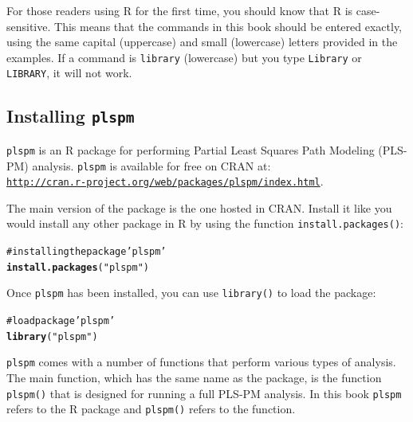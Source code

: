 \documentclass[12pt]{book}\usepackage{graphicx, color}
\makeatletter
\newcommand{\hlfunctioncall}[1]{\textcolor[rgb]{0.501960784313725,0,0.329411764705882}{\textbf{#1}}}%
\newcommand{\hlstring}[1]{\textcolor[rgb]{0.6,0.6,1}{#1}}%
\newcommand{\hlcomment}[1]{\textcolor[rgb]{0.180392156862745,0.6,0.341176470588235}{#1}}%
\newenvironment{kframe}{%
 \def\at@end@of@kframe{}%
 \ifinner\ifhmode%
  \def\at@end@of@kframe{\end{minipage}}%
  \begin{minipage}{\columnwidth}%
 \fi\fi%
 \def\FrameCommand##1{\hskip\@totalleftmargin \hskip-\fboxsep
 \colorbox{shadecolor}{##1}\hskip-\fboxsep
     \hskip-\linewidth \hskip-\@totalleftmargin \hskip\columnwidth}%
 \MakeFramed {\advance\hsize-\width
   \@totalleftmargin\z@ \linewidth\hsize
   \@setminipage}}%
 {\par\unskip\endMakeFramed%
 \at@end@of@kframe}
\newenvironment{knitrout}{}{} %
\newcommand{\plspm}{\texttt{plspm}}
\newcommand{\fplspm}{\texttt{plspm()}}
\newcommand{\code}[1]{\texttt{#1}}
\makeatother
\begin{document}
For those readers using R for the first time, you should know that R is case-sensitive. This means that the commands in this book should be entered exactly, using the same capital (uppercase) and small (lowercase) letters provided in the examples. If a command is \code{library} (lowercase) but you type \code{Library} or \code{LIBRARY}, it will not work.



\subsection{Installing \plspm{}}
\plspm{} is an R package for performing Partial Least Squares Path Modeling (PLS-PM) analysis. \plspm{} is available for free on CRAN at: \\ 
\texttt{\href{http://cran.r-project.org/web/packages/plspm/index.html}{http://cran.r-project.org/web/packages/plspm/index.html}}.

The main version of the package is the one hosted in CRAN. Install it like you would install any other package in R by using the function \code{install.packages()}:
\begin{knitrout}
\color{fgcolor}\begin{kframe}
\begin{alltt}
\hlcomment{# installing the package 'plspm'}
\hlfunctioncall{install.packages}(\hlstring{"plspm"})
\end{alltt}
\end{kframe}
\end{knitrout}


Once \plspm{} has been installed, you can use \code{library()} to load the package: 
\begin{knitrout}
\color{fgcolor}\begin{kframe}
\begin{alltt}
\hlcomment{# load package 'plspm'}
\hlfunctioncall{library}(\hlstring{"plspm"})
\end{alltt}
\end{kframe}
\end{knitrout}


\plspm{} comes with a number of functions that perform various types of analysis. The main function, which has the same name as the package, is the function \fplspm{} that is designed for running a full PLS-PM analysis. In this book \plspm{} refers to the R package and \fplspm{} refers to the function.
\end{document}
